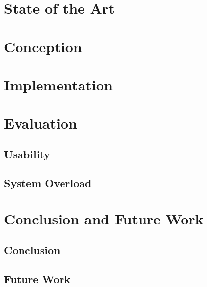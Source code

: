\documentclass[english, BCOR=6mm, twoside=true, open=right]{tudscrreprt}
\begin{document}
\chapter{State of the Art}\label{chapter:state-of-the-art}



\chapter{Conception}




\chapter{Implementation}



\chapter{Evaluation}
\section{Usability}
\section{System Overload}


\chapter{Conclusion and Future Work}
\section{Conclusion}
\section{Future Work}


\newpage
{}
\listoffigures

\newpage
{}
\listoftables

\newpage
{}
\lstlistoflistings

\newpage
{}
\printglossary

\newpage
{}


\end{document}
